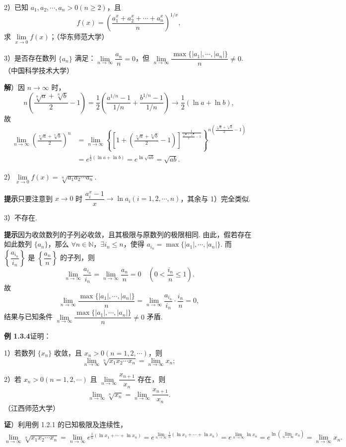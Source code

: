 \documentclass[UTF8,12pt,a4paper,fontset=fandol]{ctexart}
\begin{document}
2）已知 $a_1,a_2,\cdots,a_n>0(n\ge2)$，且
\[
  f(x)=\left(\frac{a_1^x+a_2^x+\cdots+a_n^x}{n}\right)^{1/x},
\]
求 $\lim\limits_{x\to0}f(x)$；（华东师范大学）

3）是否存在数列 $\{a_n\}$ 满足：$\lim\limits_{n\to\infty}\dfrac{a_n}{n}=0$，但 $\lim\limits_{n\to\infty}\dfrac{\max\{|a_1|,\cdots,|a_n|\}}n\ne0$.（中国科学技术大学）

\noindent\textbf{解}）因 $n\to\infty$ 时，
\[
n\left(\frac{\sqrt[n]{a}+\sqrt[n]{b}}2-1\right)
=\frac12\left(\frac{a^{1/n}-1}{1/n}+\frac{b^{1/n}-1}{1/n}\right)
\to\frac12(\ln a+\ln b),
\]
故
\[
\begin{aligned}
\lim_{n\to\infty}\left(\frac{\sqrt[n]{a}+\sqrt[n]{b}}2\right)^n
&=\lim_{n\to\infty}
\left\{\left[1+\left(\frac{\sqrt[n]{a}+\sqrt[n]{b}}2-1\right)\right]^{
\frac1{\frac{\sqrt[n]{a}+\sqrt[n]{b}}2-1}}\right\}^{
n\left(\frac{\sqrt[n]{a}+\sqrt[n]{b}}2-1\right)}\\
&=e^{\frac12(\ln a+\ln b)}=e^{\ln\sqrt{ab}}=\sqrt{ab}.
\end{aligned}
\]

2）$\lim\limits_{x\to0}f(x)=\sqrt[n]{a_1a_2\cdots a_n}$.

\noindent\textbf{提示}\quad 只要注意到 $x\to0$ 时 $\dfrac{a_i^x-1}{x}\to\ln a_i(i=1,2,\cdots,n)$，其余与 1）完全类似.

3）不存在.

\noindent\textbf{提示}\quad 因为收敛数列的子列必收敛，且其极限与原数列的极限相同. 由此，假若存在如此数列 $\{a_n\}$，那么 $\forall n\in\mathbb{N}$，$\exists i_n\le n$，使得 $a_{i_n}=\max\{|a_1|,\cdots,|a_n|\}$. 而 $\left\{\dfrac{a_{i_n}}{i_n}\right\}$ 是 $\left\{\dfrac{a_n}{n}\right\}$ 的子列，则
\[
  \lim_{n\to\infty}\frac{a_{i_n}}{i_n}=\lim_{n\to\infty}\frac{a_n}{n}=0\quad\left(0<\frac{i_n}{n}\le1\right).
\]
故
\[
  \lim_{n\to\infty}\frac{\max\{|a_1|,\cdots,|a_n|\}}n
  =\lim_{n\to\infty}\frac{a_{i_n}}{i_n}\cdot\frac{i_n}{n}=0,
\]
结果与已知条件 $\lim\limits_{n\to\infty}\dfrac{\max\{|a_1|,\cdots,|a_n|\}}n\ne0$ 矛盾.

\noindent\textbf{例 1.3.4}\quad 证明：

1）若数列 $\{x_n\}$ 收敛，且 $x_n>0(n=1,2,\cdots)$，则
\[
  \lim_{n\to\infty}\sqrt[n]{x_1x_2\cdots x_n}
  =\lim_{n\to\infty}x_n;
\]

2）若 $x_n>0(n=1,2,\cdots)$ 且 $\lim\limits_{n\to\infty}\dfrac{x_{n+1}}{x_n}$ 存在，则
\[
  \lim_{n\to\infty}\sqrt[n]{x_n}
  =\lim_{n\to\infty}\frac{x_{n+1}}{x_n}.
\]
（江西师范大学）

\noindent\textbf{证}）利用例 1.2.1 的已知极限及连续性，
\[
\lim_{n\to\infty}\sqrt[n]{x_1x_2\cdots x_n}
=\lim_{n\to\infty}e^{\frac1n(\ln x_1+\cdots+\ln x_n)}
=e^{\lim\limits_{n\to\infty}\frac1n(\ln x_1+\cdots+\ln x_n)}
=e^{\lim\limits_{n\to\infty}\ln x_n}
=e^{\ln(\lim\limits_{n\to\infty}x_n)}
=\lim_{n\to\infty}x_n.
\]
\end{document}
